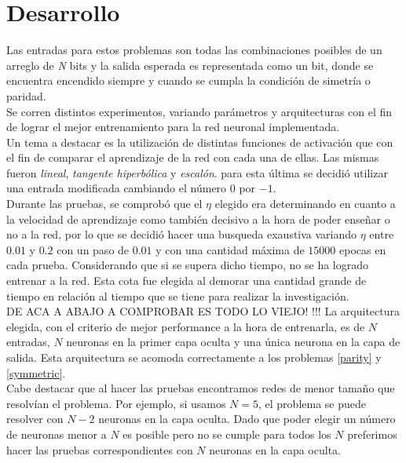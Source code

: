 \documentclass{sig-alternate}
\begin{document}
\section*{Desarrollo}
	Las entradas para estos problemas son todas las combinaciones posibles de un arreglo de \textit{N} bits y la salida esperada es representada como un bit, donde se encuentra encendido siempre y cuando se cumpla la condici\'on de simetr\'ia o paridad. \\
	Se corren distintos experimentos, variando par\'ametros y arquitecturas con el fin de lograr el mejor entrenamiento para la red neuronal implementada. \\
	Un tema a destacar es la utilizaci\'on de distintas funciones de activaci\'on que con el fin de comparar el aprendizaje de la red con cada una de ellas. Las mismas fueron \textit{lineal}, \textit{tangente hiperb\'olica} y \textit{escal\'on}. para esta \'ultima se decidi\'o utilizar una entrada modificada cambiando el n\'umero $0$ por $-1$. \\
	Durante las pruebas, se comprob\'o que el $\eta$ elegido era determinando en cuanto a la velocidad de aprendizaje como tambi\'en decisivo a la hora de poder ense\~nar o no a la red, por lo que se decidi\'o hacer una busqueda exaustiva variando $\eta$ entre $0.01$ y $0.2$ con un paso de $0.01$ y con una cantidad m\'axima de $15000$ epocas en cada prueba. Considerando que si se supera dicho tiempo, no se ha logrado entrenar a la red. Esta cota fue elegida al demorar una cantidad grande de tiempo en relaci\'on al tiempo que se tiene para realizar la investigaci\'on. \\
	DE ACA A ABAJO A COMPROBAR  ES TODO LO VIEJO! !!!
	 La arquitectura elegida, con el criterio de mejor performance a la hora de entrenarla, es de $N$ entradas, $N$ neuronas en la primer capa oculta y una \'unica neurona en la capa de salida. Esta arquitectura se acomoda correctamente a los problemas \ref{parity} y \ref{symmetric}. \\
	Cabe destacar que al hacer las pruebas encontramos redes de menor
	tama\~no que resolv\'ian el problema.
	Por ejemplo, si usamos $N = 5$, el problema se puede resolver con
	$N-2$ neuronas en la capa oculta. Dado que poder elegir un n\'umero
	de neuronas menor a $N$ es posible pero no se cumple para todos
	los $N$ preferimos hacer las pruebas correspondientes con $N$ neuronas
	en la capa oculta.
\end{document}
